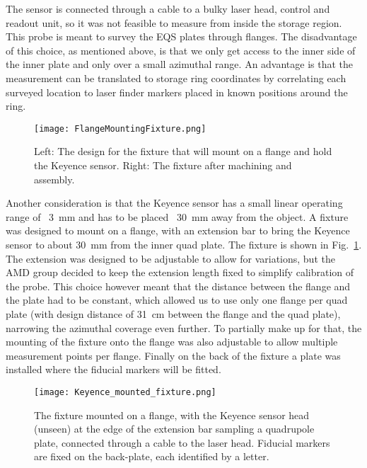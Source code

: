 The sensor is connected through a cable to a bulky laser head, control and readout unit, so it was not feasible to measure from inside the storage region. This probe is meant to survey the EQS plates through flanges. 
The disadvantage of this choice, as mentioned above, is that we only get access to the inner side of the inner plate and only over a small azimuthal range. 
An advantage is that the measurement can be translated to storage ring coordinates by correlating each surveyed location to laser finder markers placed in known positions around the ring. 

\begin{figure}[]
	\centering
	\texttt{[image: FlangeMountingFixture.png]}
	\caption{Left: The design for the fixture that will mount on a flange and hold the Keyence sensor. Right: The fixture after machining and assembly.
	}\label{fig:FlangeMountingFixture}
\end{figure}


Another consideration is that the Keyence sensor has a small linear operating range of ~\SI{3}{mm} and has to be placed ~\SI{30}{mm} away from the object. 
A fixture was designed to mount on a flange, with an extension bar to bring the Keyence sensor to about \SI{30}{mm} from the inner quad plate. The fixture is shown in Fig.~\ref{fig:FlangeMountingFixture}.
The extension was designed to be adjustable to allow for variations, but the AMD group decided to keep the extension length fixed to simplify calibration of the probe. This choice however meant that the distance between the flange and the plate had to be constant, which allowed us to use only one flange per quad plate (with design distance of \SI{31}{cm} between the flange and the quad plate), narrowing the azimuthal coverage even further. %
To partially make up for that, the mounting of the fixture onto the flange was also adjustable to allow multiple measurement points per flange.
Finally on the back of the fixture a plate was installed where the fiducial markers will be fitted.


\begin{figure}[]
	\centering
	\texttt{[image: Keyence\_mounted\_fixture.png]}
	\caption{The fixture mounted on a flange, with the Keyence sensor head (unseen) at the edge of the extension bar sampling a quadrupole plate, connected through a cable to the laser head. Fiducial markers are fixed on the back-plate, each identified by a letter.
	}\label{fig:Keyence_mounted_fixture}
\end{figure}


